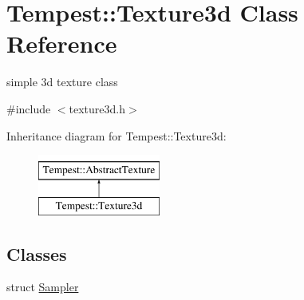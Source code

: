 \hypertarget{class_tempest_1_1_texture3d}{\section{Tempest\+:\+:Texture3d Class Reference}
\label{class_tempest_1_1_texture3d}
}


simple 3d texture class  




{\ttfamily \#include $<$texture3d.\+h$>$}

Inheritance diagram for Tempest\+:\+:Texture3d\+:\begin{figure}[H]
\begin{center}
\leavevmode
\includegraphics[height=2.000000cm]{class_tempest_1_1_texture3d}
\end{center}
\end{figure}
\subsection*{Classes}
\begin{DoxyCompactItemize}
\item 
struct \hyperlink{struct_tempest_1_1_texture3d_1_1_sampler}{Sampler}
\end{DoxyCompactItemize}
